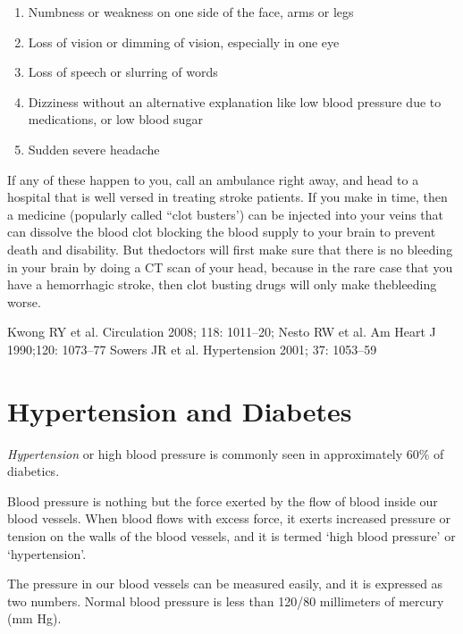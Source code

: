 \begin{enumerate}[•]
\itemsep=0pt
\item Numbness or weakness on one side of the face, arms or legs
\item Loss of vision or dimming of vision, especially in one eye
\item Loss of speech or slurring of words
\item Dizziness without an alternative explanation like low blood pressure due to medications, or low blood sugar
\item Sudden severe headache
\end{enumerate}

If any of these happen to you, call an ambulance right away, and head to a hospital that is well versed in treating stroke patients. If you make in time, then a medicine (popularly called “clot busters’) can be injected into your veins that can dissolve the blood clot blocking the blood supply to your brain to prevent death and disability. But the\break doctors will first make sure that there is no bleeding in your brain by doing a CT scan of your head, because in the rare case that you have a hemorrhagic stroke, then clot busting drugs will only make the\break bleeding worse.

\begin{thebibliography}{99}
 Kwong RY et al. Circulation 2008; 118: 1011–20; Nesto RW et al. Am Heart J 1990;120: 1073–77
 Sowers JR et al. Hypertension 2001; 37: 1053–59
\end{thebibliography}

\newpage
 
\renewcommand{\thechapter}{\arabic{chapter}A}
\chapter{Hypertension and Diabetes}\label{chap13A}

\textit{Hypertension} or high blood pressure is commonly seen in approximately 60\% of diabetics.

Blood pressure is nothing but the force exerted by the flow of blood inside our blood vessels. When blood flows with excess force, it exerts increased pressure or tension on the walls of the blood vessels, and it is termed ‘high blood pressure’ or ‘hypertension’.

The pressure in our blood vessels can be measured easily, and it is expressed as two numbers. Normal blood pressure is less than 120/80 millimeters of mercury (mm Hg).

